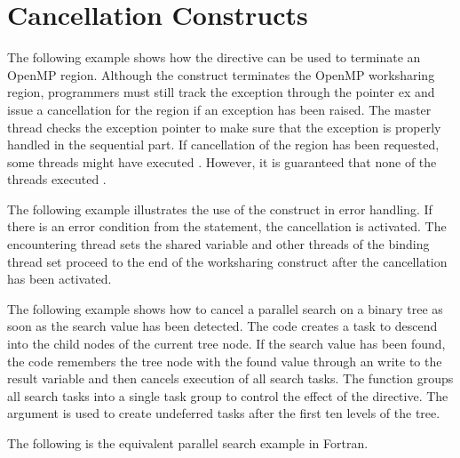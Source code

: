 \pagebreak
\section{Cancellation Constructs}
\label{sec:cancellation}

The following example shows how the  directive can be used to terminate 
an OpenMP region. Although the  construct terminates the OpenMP 
worksharing region, programmers must still track the exception through the pointer 
ex and issue a cancellation for the  region if an exception has 
been raised. The master thread checks the exception pointer to make sure that the 
exception is properly handled in the sequential part. If cancellation of the  
region has been requested, some threads might have executed . 
However, it is guaranteed that none of the threads executed .



The following example illustrates the use of the  construct in error 
handling. If there is an error condition from the  statement, 
the cancellation is activated. The encountering thread sets the shared variable 
 and other threads of the binding thread set proceed to the end of 
the worksharing construct after the cancellation has been activated. 


The following example shows how to cancel a parallel search on a binary tree as 
soon as the search value has been detected. The code creates a task to descend 
into the child nodes of the current tree node. If the search value has been found, 
the code remembers the tree node with the found value through an  
write to the result variable and then cancels execution of all search tasks. The 
function  groups all search tasks into a single 
task group to control the effect of the  directive. The 
 argument is used to create undeferred tasks after the first ten 
levels of the tree.



The following is the equivalent parallel search example in Fortran.



